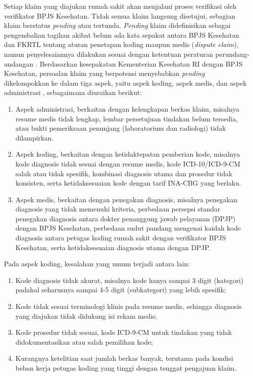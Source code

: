 Setiap klaim yang diajukan rumah sakit akan menjalani proses verifikasi oleh verifikator BPJS Kesehatan. Tidak semua klaim langsung disetujui, sebagian klaim berstatus \textit{pending} atau tertunda. \textit{Pending} klaim didefinisikan sebagai pengembalian tagihan akibat belum ada kata sepakat antara BPJS Kesehatan dan FKRTL tentang aturan penetapan koding maupun medis (\textit{dispute claim}), namun penyelesaiannya dilakukan sesuai dengan ketentuan peraturan perundang-undangan \cite{14}. Berdasarkan kesepakatan Kementerian Kesehatan RI dengan BPJS Kesehatan, persoalan klaim yang berpotensi menyebabkan \textit{pending} dikelompokkan ke dalam tiga aspek, yaitu aspek koding, aspek medis, dan aspek administrasi \cite{10}, sebagaimana diuraikan berikut:
\begin{enumerate}
    \item Aspek administrasi, berkaitan dengan kelengkapan berkas klaim, misalnya resume medis tidak lengkap, lembar persetujuan tindakan belum tersedia, atau bukti pemeriksaan penunjang (laboratorium dan radiologi) tidak dilampirkan.
    \item Aspek koding, berkaitan dengan ketidaktepatan pemberian kode, misalnya kode diagnosis tidak sesuai dengan resume medis, kode ICD-10/ICD-9-CM salah atau tidak spesifik, kombinasi diagnosis utama dan prosedur tidak konsisten, serta ketidaksesuaian kode dengan tarif INA-CBG yang berlaku.
    \item Aspek medis, berkaitan dengan penegakan diagnosis, misalnya penegakan diagnosis yang tidak memenuhi kriteria, perbedaan persepsi standar penegakan diagnosis antara dokter penanggung jawab pelayanan (DPJP) dengan BPJS Kesehatan, perbedaan sudut pandang mengenai kaidah kode diagnosis antara petugas koding rumah sakit dengan verifikator BPJS Kesehatan, serta ketidaksesuaian diagnosis utama dengan DPJP.
\end{enumerate}

Pada aspek koding, kesalahan yang umum terjadi antara lain:
\begin{enumerate}
    \item Kode diagnosis tidak akurat, misalnya kode hanya sampai 3 digit (kategori) padahal seharusnya sampai 4-5 digit (subkategori) yang lebih spesifik;
    \item Kode tidak sesuai terminologi klinis pada resume medis, sehingga diagnosis yang diajukan tidak didukung isi rekam medis;
    \item Kode prosedur tidak sesuai, kode ICD-9-CM untuk tindakan yang tidak didokumentasikan atau salah pemilihan kode;
    \item Kurangnya ketelitian saat jumlah berkas banyak, terutama pada kondisi beban kerja petugas koding yang tinggi dengan tenggat pengajuan klaim.
\end{enumerate}

